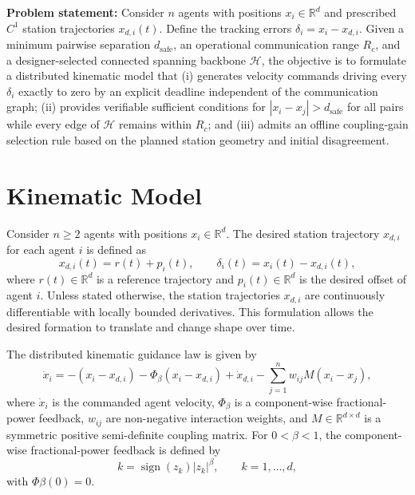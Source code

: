 \documentclass[letterpaper,10pt,conference]{ieeeconf}
\begin{document}
\vspace{1em}
\noindent \textbf{Problem statement:} 
Consider $n$ agents with positions $x_i\in\mathbb R^d$ and prescribed $C^1$ station trajectories $x_{d,i}(t)$. Define the tracking errors $\delta_i=x_i-x_{d,i}$. Given a minimum pairwise separation $d_{\mathrm{safe}}$, an operational communication range $R_c$, and a designer-selected connected spanning backbone $\mathcal H$, the objective is to formulate a distributed kinematic model that (i) generates velocity commands driving every $\delta_i$ exactly to zero by an explicit deadline independent of the communication graph; (ii) provides verifiable sufficient conditions for $|x_i-x_j|>d_{\mathrm{safe}}$ for all pairs while every edge of $\mathcal H$ remains within $R_c$; and (iii) admits an offline coupling-gain selection rule based on the planned station geometry and initial disagreement.

\section{Kinematic Model}
\label{sec:model}

Consider $n\geq 2$ agents with positions $x_i\in\mathbb{R}^d$. The desired station trajectory $x_{d,i}$ for each agent $i$ is defined as
\begin{equation}
x_{d,i}(t)=r(t)+p_i(t),\qquad
\delta_i(t)=x_i(t)-x_{d,i}(t),
\label{eq:station}
\end{equation}
where $r(t)\in\mathbb{R}^d$ is a reference trajectory and $p_i(t)\in\mathbb{R}^d$ is the desired offset of agent $i$. Unless stated otherwise, the station trajectories $x_{d,i}$ are continuously differentiable with locally bounded derivatives. This formulation allows the desired formation to translate and change shape over time.

The distributed kinematic guidance law is given by
\begin{equation}
    \dot{x}_i =
    -(x_i - x_{d,i})-\Phi_\beta(x_i - x_{d,i})
    +\dot x_{d,i} -\sum_{j=1}^{n}w_{ij}M(x_i-x_j),
    \label{eq:kinematic-model}
\end{equation}
where $\dot{x}_i$ is the commanded agent velocity, $\Phi_\beta$ is a component-wise fractional-power feedback, $w_{ij}$ are non-negative interaction weights, and $M\in\mathbb{R}^{d\times d}$ is a symmetric positive semi-definite coupling matrix. For $0<\beta<1$, the component-wise fractional-power feedback is defined by
\begin{equation}
[\Phi_\beta(z)]k
=\operatorname{sign}(z_k)|z_k|^\beta,
\qquad k=1,\ldots,d,
\label{eq}
\end{equation}
with $\Phi\beta(0)=0$.
\end{document}
